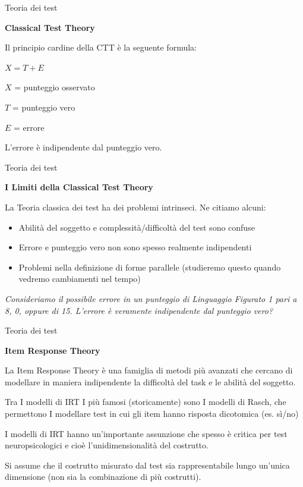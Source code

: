 \documentclass[
  ignorenonframetext,
]{beamer}
\begin{document}
\begin{frame}{Teoria dei test}
\label{teoria-dei-test-1}
\begin{center}
  \textbf{Classical Test Theory}
\end{center}

Il principio cardine della CTT è la seguente formula:

\begin{center}
$X = T + E$
\end{center}
\pause

\(X\) = punteggio osservato

\(T\) = punteggio vero

\(E\) = errore \pause \vspace{1.5em}

L'errore è indipendente dal punteggio vero.
\end{frame}

\begin{frame}{Teoria dei test}
\label{teoria-dei-test-2}
\begin{center}
  \textbf{I Limiti della Classical Test Theory}
\end{center}

La Teoria classica dei test ha dei problemi intrinseci. Ne citiamo
alcuni: \pause

\begin{itemize}
\item
  Abilità del soggetto e complessità/difficoltà del test sono confuse
\item
  Errore e punteggio vero non sono spesso realmente indipendenti
\item
  Problemi nella definizione di forme parallele (studieremo questo
  quando vedremo cambiamenti nel tempo)
\end{itemize}

\pause

\emph{Consideriamo il possibile errore in un punteggio di Linguaggio
Figurato 1 pari a 8, 0, oppure di 15. L'errore è veramente indipendente
dal punteggio vero?}
\end{frame}

\begin{frame}{Teoria dei test}
\label{teoria-dei-test-3}
\begin{center}
  \textbf{Item Response Theory}
\end{center}

La Item Response Theory è una famiglia di metodi più avanzati che
cercano di modellare in maniera indipendente la difficoltà del task e le
abilità del soggetto.

Tra I modelli di IRT I più famosi (storicamente) sono I modelli di
Rasch, che permettono I modellare test in cui gli item hanno risposta
dicotomica (es. sì/no) \pause

I modelli di IRT hanno un'importante assunzione che spesso è critica per
test neuropsicologici e cioè l'unidimensionalità del costrutto. \pause

Si assume che il costrutto misurato dal test sia rappresentabile lungo
un'unica dimensione (non sia la combinazione di più costrutti).
\end{frame}
\end{document}
